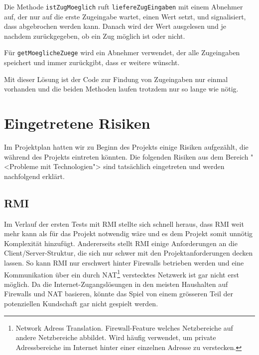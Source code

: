\documentclass[12pt,halfparskip]{scrartcl}
\begin{document}
Die Methode \texttt{istZugMoeglich} ruft \texttt{liefereZugEingaben} mit einem Abnehmer auf, der nur auf die erste Zugeingabe wartet, einen Wert setzt, und signalisiert, dass abgebrochen werden kann. Danach wird der Wert ausgelesen und je nachdem zurückgegeben, ob ein Zug möglich ist oder nicht.

Für \texttt{getMoeglicheZuege} wird ein Abnehmer verwendet, der alle Zugeingaben speichert und immer zurückgibt, dass er weitere wünscht.

Mit dieser Lösung ist der Code zur Findung von Zugeingaben nur einmal vorhanden und die beiden Methoden laufen trotzdem nur so lange wie nötig.

\clearpage
\section{Eingetretene Risiken}
\label{eingetretene_risiken}

Im Projektplan hatten wir zu Beginn des Projekts einige Risiken aufgezählt, die während des Projekts eintreten könnten. Die folgenden Risiken aus dem Bereich "<Probleme mit Technologien"> sind tatsächlich eingetreten und werden nachfolgend erklärt.


\subsection{RMI}
\label{sub:rmi}

Im Verlauf der ersten Tests mit RMI stellte sich schnell heraus, dass RMI weit mehr kann als für das Projekt notwendig wäre und es dem Projekt somit unnötig Komplexität hinzufügt. Andererseits stellt RMI  einige Anforderungen an die Client/Server-Struktur, die sich nur schwer mit den Projektanforderungen decken lassen. So kann RMI nur erschwert hinter Firewalls betrieben werden und eine Kommunikation über ein durch NAT\footnote{Network Adress Translation. Firewall-Feature welches Netzbereiche auf andere Netzbereiche abbildet. Wird häufig verwendet, um private Adressbereiche im Internet hinter einer einzelnen Adresse zu verstecken.} verstecktes Netzwerk ist gar nicht erst möglich. Da die Internet-Zugangslösungen in den meisten Haushalten auf Firewalls und NAT basieren, könnte das Spiel von einem grösseren Teil der potenziellen Kundschaft gar nicht gespielt werden.
\end{document}
